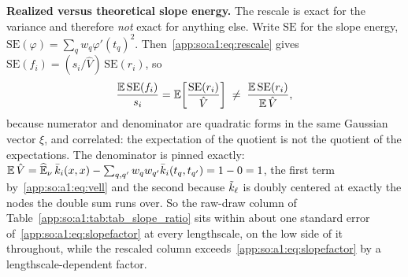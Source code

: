 \begin{table}[htbp]
  \centering
  \caption[The quadrature gap between $\nuhat$ and $\refnu$]{
  The gap between $\nuhat$ and $\refnu$: worst $|\Enu f_i|$ and
  $|\Varnu f_i-s|$ over draws whose $\nuhat$-moments are $0$ and $s$
  by~\eqref{app:so:a1:eq:exactshare}. Measured, not closed form: $N=20$ draws
  per $\ell$ at share $0.25$, a fresh  seeded
  $0,\dots,19$, with the $\refnu$-moments evaluated by a $10^6$-point midpoint
  rule. The gap scales with roughness, as a fixed-node quadrature of a
  piecewise cubic must.}\label{app:so:a1:tab:tab_quadrature_gap}
  \small\setlength{\tabcolsep}{3pt}
  
\end{table}

\textbf{Realized versus theoretical slope energy.} The rescale is exact for
the variance and therefore \emph{not} exact for anything else. Write
$\mathrm{SE}$ for the slope energy, $\mathrm{SE}(\varphi)=\sum_q w_q
{\varphi'(t_q)}^2$. Then~\eqref{app:so:a1:eq:rescale} gives
$\mathrm{SE}(f_i)=(s_i/\hat V)\,\mathrm{SE}(r_i)$, so
\begin{equation}\label{app:so:a1:eq:slopeinflate}
  \frac{\Ex{}\mathrm{SE}(f_i)}{s_i}
  =\Ex{}\!\left[\frac{\mathrm{SE}(r_i)}{\hat V}\right]
  \;\neq\;
  \frac{\Ex{}\mathrm{SE}(r_i)}{\Ex{}\hat V},
\end{equation}
because numerator and denominator are quadratic forms in the same Gaussian
vector $\xi$, and correlated: the expectation of the quotient is not the
quotient of the expectations. The denominator is pinned exactly:
$\Ex{}\hat V=\Ehat\kbar(x,x)-\sum_{q,q'}w_q w_{q'}\kbar(t_q,t_{q'})=1-0=1$,
the first
term by~\eqref{app:so:a1:eq:vell} and the second because $\tilde k_\ell$ is doubly
centered at exactly the nodes the double sum runs over. So the raw-draw column
of Table~\ref{app:so:a1:tab:tab_slope_ratio} sits within about one standard
error of~\eqref{app:so:a1:eq:slopefactor} at every lengthscale, on the low side
of it throughout, while the rescaled column
exceeds~\eqref{app:so:a1:eq:slopefactor} by a lengthscale-dependent factor.

\begin{table}[htbp]
  \centering
  \caption[Slope energy per unit variance, theory against draws]{
  Slope energy per unit variance: the closed
  form~\eqref{app:so:a1:eq:slopefactor}, the centered but unrescaled draw, and
  the rescaled component~\eqref{app:so:a1:eq:rescale}. Measured, not closed
  form: $N=2000$ draws per $\ell$,  seeded $12345$ and
  restarted fresh for each $\ell$, on the production $1024$-point unit grid;
  each mean is reported $\pm$ its standard error, the sample standard
  deviation over $\sqrt N$. The last column is the inflation factor
  of~\eqref{app:so:a1:eq:slopeinflate}.}\label{app:so:a1:tab:tab_slope_ratio}
  \small\setlength{\tabcolsep}{3pt}
  
\end{table}

